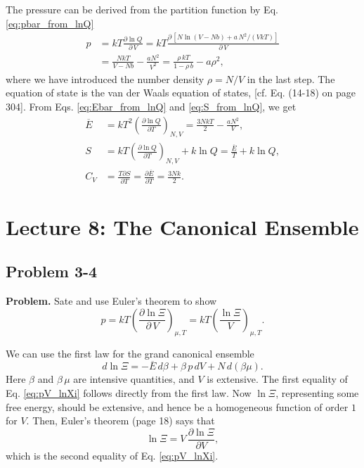 \documentclass[twocolumn, 10pt]{article}
\numberwithin{equation}{section}
\newenvironment{problem}
{\par\medskip\sffamily \color{problue}
  \textbf{Problem. }\ignorespaces}
{\medskip}
\newenvironment{solution}[1][\empty]
{\par\medskip
  \textbf{\ifx\empty#1{Solution.}\relax\else{#1}\fi} \ignorespaces}
{\medskip}
\begin{document}
\begin{solution}
The pressure can be derived from the partition function
by Eq. \eqref{eq:pbar_from_lnQ}
%
\begin{align*}
p &=
  kT \frac{ \partial \ln Q } { \partial \, V }
=
  kT \frac{ \partial \, [ N \ln (V - N b)
   + a \, N^2 / (V k T)] }
  { \partial \, V }
\\
&=
  \frac{ N k T } { V - N b} - \frac{ a N^2 }{ V^2 }
=
  \frac{ \rho \, k T } { 1 - \rho \, b} - a \rho^2
,
\end{align*}
%
where we have introduced
the number density $\rho = N/V$ in the last step.
%
The equation of state is the van der Waals equation of states,
  [cf. Eq. (14-18) on page 304].
%
From Eqs. \eqref{eq:Ebar_from_lnQ} and \eqref{eq:S_from_lnQ},
we get
\begin{align*}
\overline E
&=
    kT^2 \left(
      \frac{ \partial \ln Q }
           { \partial T }
    \right)_{N, V}
=
  \frac{ 3 N k T }{2}
  -\frac{ a N^2 } { V}
,
\\
S
&=
    kT \left(
      \frac{ \partial \ln Q }
           { \partial T }
    \right)_{N, V}
    + k \ln Q
=
  \frac{ \overline E } { T }
  + k \ln Q
,
\\
C_V
&=
\frac{ T \partial S } { \partial T }
=
\frac{ \partial \overline E } { \partial T }
= \frac{ 3 N k}{2}
.
\end{align*}
\end{solution}

\section{Lecture 8: The Canonical Ensemble}

\subsection{Problem 3-4}

\begin{problem}
  Sate and use Euler's theorem to show
  \begin{equation}
  p
  = kT \left(
    \frac{ \partial \ln \Xi } { \partial \, V }
    \right)_{\mu, T}
  = kT \left(
    \frac{ \ln \Xi } { V }
    \right)_{\mu, T}
  .
    \label{eq:pV_lnXi}
  \end{equation}
\end{problem}

\begin{solution}
We can use the first law for the grand canonical ensemble
$$
d\ln\Xi = -\overline E \, d\beta + \beta \, p \, d V + N \, d(\beta\mu).
$$
Here $\beta$ and $\beta\,\mu$
are intensive quantities, and $V$ is extensive.
%
The first equality of Eq. \eqref{eq:pV_lnXi}
follows directly from the first law.
%
Now $\ln\Xi$, representing some free energy,
should be extensive,
and hence be a homogeneous function of order $1$
for $V$.
%
Then, Euler's theorem (page 18) says that
$$
\ln\Xi = V \, \frac{ \partial \ln \Xi } { \partial V },
$$
which is the second equality of Eq. \eqref{eq:pV_lnXi}.
\end{solution}
\end{document}
